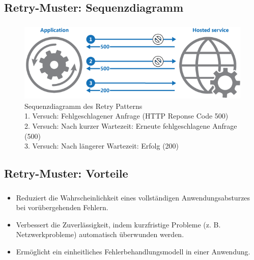 \subsection{Retry-Muster: Sequenzdiagramm}
\begin{frame}
    \frametitle{\insertsection}
    \framesubtitle{\insertsubsection}

    \begin{figure}[h]
        \centering
        \vspace*{-10pt} %
        \includegraphics[height=0.40\textheight]{../images/retry-pattern2}
        \caption{Sequenzdiagramm des Retry Patterns~\cite{Microsoft.}\\
        1. Versuch: Fehlgeschlagener Anfrage (HTTP Reponse Code 500)\\
        2. Versuch: Nach kurzer Wartezeit: Erneute fehlgeschlagene Anfrage (500)\\
        3. Versuch: Nach längerer Wartezeit: Erfolg (200)\\
        }
    \end{figure}
\end{frame}

\subsection{Retry-Muster: Vorteile}
\begin{frame}
    \frametitle{\insertsection}
    \framesubtitle{\insertsubsection}

    \begin{itemize}
    \item Reduziert die Wahrscheinlichkeit eines vollständigen Anwendungsabsturzes bei vorübergehenden Fehlern.
    \item Verbessert die Zuverlässigkeit, indem kurzfristige Probleme (z. B. Netzwerkprobleme) automatisch überwunden werden.
    \item Ermöglicht ein einheitliches Fehlerbehandlungsmodell in einer Anwendung.
\end{itemize}
\end{frame}

